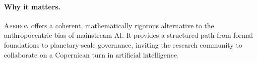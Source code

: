 \paragraph{Why it matters.}
\textsc{Apeiron} offers a coherent, mathematically rigorous
alternative to the anthropocentric bias of mainstream AI.  It
provides a structured path from formal foundations to planetary‑scale
governance, inviting the research community to collaborate on a
Copernican turn in artificial intelligence.